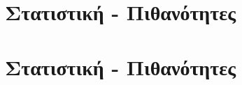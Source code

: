 



\chapter{Στατιστική - Πιθανότητες}

    

    

    

    

    

    

\chapter{Στατιστική - Πιθανότητες}

    

    

    

    

    

    
    
